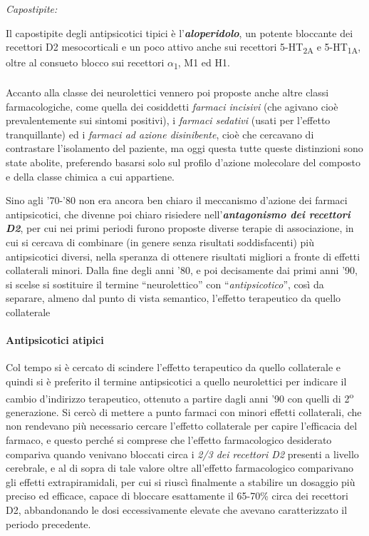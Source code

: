 \emph{\emph{Capostipite:}}

Il capostipite degli antipsicotici tipici è
l'\textbf{\emph{aloperidolo}}, un potente bloccante dei recettori D2
mesocorticali e un poco attivo anche sui recettori
5-HT\textsubscript{2A} e 5-HT\textsubscript{1A}, oltre al consueto
blocco sui recettori $\alpha$\textsubscript{1}, M1 ed H1.
\\\\
Accanto alla classe dei neurolettici vennero poi proposte anche altre
classi farmacologiche, come quella dei cosiddetti \emph{farmaci
incisivi} (che agivano cioè prevalentemente sui sintomi positivi), i
\emph{farmaci sedativi} (usati per l'effetto tranquillante) ed i
\emph{farmaci ad azione disinibente}, cioè che cercavano di contrastare
l'isolamento del paziente, ma oggi questa tutte queste distinzioni sono
state abolite, preferendo basarsi solo sul profilo d'azione molecolare
del composto e della classe chimica a cui appartiene.

Sino agli '70-'80 non era ancora ben chiaro il meccanismo d'azione dei
farmaci antipsicotici, che divenne poi chiaro risiedere
nell'\textbf{\emph{antagonismo dei recettori D2}}, per cui nei primi
periodi furono proposte diverse terapie di associazione, in cui si
cercava di combinare (in genere senza risultati soddisfacenti) più
antipsicotici diversi, nella speranza di ottenere risultati migliori a
fronte di effetti collaterali minori. Dalla fine degli anni '80, e poi
decisamente dai primi anni '90, si scelse si sostituire il termine
``neurolettico'' con ``\emph{antipsicotico}'', così da separare, almeno
dal punto di vista semantico, l'effetto terapeutico da quello
collaterale

\paragraph{Antipsicotici atipici}

Col tempo si è cercato di scindere l'effetto terapeutico da quello
collaterale e quindi si è preferito il termine antipsicotici a quello
neurolettici per indicare il cambio d'indirizzo terapeutico, ottenuto a
partire dagli anni '90 con quelli di 2\textsuperscript{o} generazione. Si cercò di mettere
a punto farmaci con minori effetti collaterali, che non rendevano più
necessario cercare l'effetto collaterale per capire l'efficacia del
farmaco, e questo perché si comprese che l'effetto farmacologico
desiderato compariva quando venivano bloccati circa i \emph{2/3 dei
recettori D2} presenti a livello cerebrale, e al di sopra di tale valore
oltre all'effetto farmacologico comparivano gli effetti extrapiramidali,
per cui si riuscì finalmente a stabilire un dosaggio più preciso ed
efficace, capace di bloccare esattamente il 65-70\% circa dei recettori
D2, abbandonando le dosi eccessivamente elevate che avevano
caratterizzato il periodo precedente.

